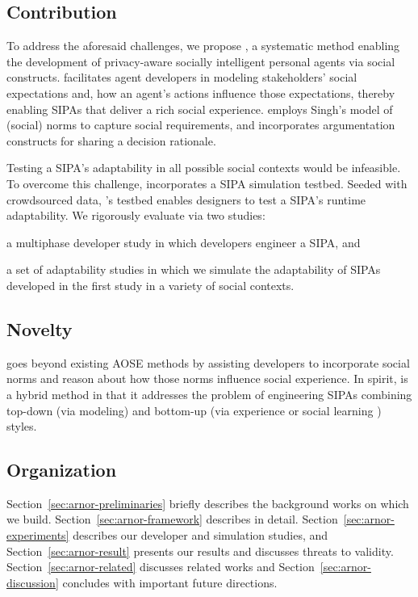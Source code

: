 \subsection{Contribution} 
To address the aforesaid challenges, we propose \frameworkA, a systematic 
method enabling the development of privacy-aware socially intelligent personal 
agents via social constructs.  \frameworkA facilitates agent developers in modeling
stakeholders' social expectations and, how an agent's actions influence 
those expectations, thereby enabling SIPAs that deliver a rich
social experience.  
\frameworkA employs Singh's \citeyearpar{Singh-2013-Norms} model of (social)
norms to capture social requirements, and incorporates argumentation
constructs \citep{BenchCapon-2007-Argumentation+AI} for
sharing a decision rationale.

Testing a SIPA's adaptability in all possible social contexts would be infeasible. 
To overcome this challenge, \frameworkA incorporates a SIPA simulation testbed. 
Seeded with crowdsourced data, \frameworkA's testbed enables designers to test a
SIPA's runtime adaptability.
We rigorously evaluate \frameworkA via two studies:
\begin{enumerate*}[label=(\arabic*)]
\item a multiphase developer study in which developers engineer a SIPA,
and
\item a set of adaptability studies in which we simulate the
adaptability of SIPAs developed in the first study in a variety of
social contexts. \end{enumerate*}

\subsection{Novelty}
\frameworkA goes beyond existing AOSE methods by assisting
developers to incorporate social norms and reason about how those norms
influence social experience. In spirit, \frameworkA is a hybrid method in
that it addresses the problem of engineering SIPAs combining top-down (via
modeling) and bottom-up (via experience or social learning
\citep{Sen-IJCAI07-NormEmergence}) styles.\\

\subsection{Organization}
Section~\ref{sec:arnor-preliminaries} briefly describes the background
works on which we build. Section~\ref{sec:arnor-framework} describes
\frameworkA in detail. Section~\ref{sec:arnor-experiments} describes our
developer and simulation studies, and Section~\ref{sec:arnor-result}
presents our results and discusses threats to validity.
Section~\ref{sec:arnor-related} discusses related works and
Section~\ref{sec:arnor-discussion} concludes with important future
directions.

